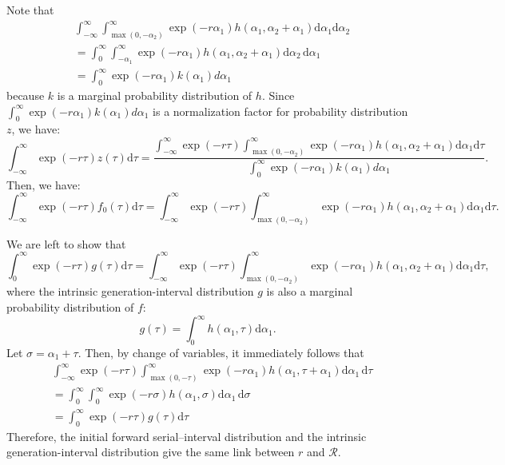 \documentclass[12pt]{article}
\newcommand{\RR}{\ensuremath{{\mathcal R}}\xspace}
\begin{document}
Note that 
\begin{equation}
\begin{aligned}
&\int_{-\infty}^\infty \int_{\max{(0,-\alpha_2)}}^{\infty} \exp(-r\alpha_1) h(\alpha_1, \alpha_2 + \alpha_1) \mathrm{d}\alpha_1 \mathrm{d}\alpha_2\\
&= \int_{0}^\infty \int_{-\alpha_1}^\infty \exp(- r \alpha_1) h(\alpha_1, \alpha_2+\alpha_1) \mathrm{d}\alpha_2\,\mathrm{d} \alpha_1\\
&= \int_{0}^\infty \exp(- r \alpha_1) k(\alpha_1) d\alpha_1
\end{aligned}
\end{equation}
because $k$ is a marginal probability distribution of $h$.
Since $\int_{0}^\infty \exp(- r \alpha_1) k(\alpha_1) d\alpha_1$ is a normalization factor for probability distribution $z$, we have:
\begin{equation}
\int_{-\infty}^\infty \exp(-r\tau) z(\tau) \mathrm{d} \tau = \frac{\int_{-\infty}^\infty \exp(-r\tau) \int_{\max{(0,-\alpha_2)}}^{\infty} \exp(-r\alpha_1) h(\alpha_1, \alpha_2 + \alpha_1) \mathrm{d}\alpha_1 \mathrm{d}\tau}{\int_{0}^\infty \exp(- r \alpha_1) k(\alpha_1) d\alpha_1}.
\end{equation}
Then, we have:
\begin{equation}
\int_{-\infty}^\infty \exp(-r\tau) f_{0}(\tau) \mathrm{d} \tau = \int_{-\infty}^\infty \exp(-r\tau) \int_{\max{(0,-\alpha_2)}}^{\infty} \exp(-r\alpha_1) h(\alpha_1, \alpha_2 + \alpha_1) \mathrm{d}\alpha_1 \mathrm{d}\tau.
\end{equation}

We are left to show that 
\begin{equation}
\int_0^{\infty} \exp(-r\tau) g(\tau) \mathrm{d}\tau = \int_{-\infty}^\infty \exp(-r\tau) \int_{\max{(0,-\alpha_2)}}^{\infty} \exp(-r\alpha_1) h(\alpha_1, \alpha_2 + \alpha_1) \mathrm{d}\alpha_1 \mathrm{d}\tau,
\end{equation}
where the intrinsic generation-interval distribution $g$ is also a marginal probability distribution of $f$:
\begin{equation}
g(\tau) = \int_0^\infty h(\alpha_1, \tau)  \mathrm{d} \alpha_1.
\end{equation}
Let $\sigma = \alpha_1 + \tau$. Then, by change of variables, it immediately follows that
\begin{equation}
\begin{aligned}
&\int_{-\infty}^{\infty} \exp(-r\tau) \int_{\max(0, -\tau)}^\infty \exp(- r \alpha_1) h(\alpha_1, \tau+\alpha_1) \mathrm{d} \alpha_1\, \mathrm{d}\tau\\
&=\int_{0}^{\infty} \int_{0}^\infty \exp(- r \sigma) h(\alpha_1, \sigma) \mathrm{d} \alpha_1\, \mathrm{d}\sigma\\
&=\int_{0}^{\infty} \exp(-r\tau) g(\tau) \mathrm{d}\tau
\end{aligned}
\end{equation}
Therefore, the initial forward serial--interval distribution and the intrinsic generation-interval distribution give the same link between $r$ and \RR.


\end{document}

